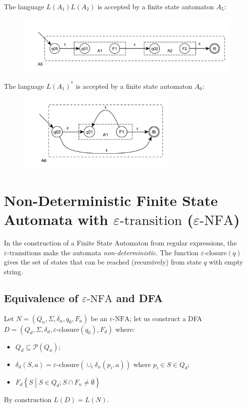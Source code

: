 The language $L(A_1)L(A_2)$ is accepted by a finite state automaton $A_5$:
\begin{figure}[H]
    \centerline{\includegraphics[width=1\textwidth]{img/8.pdf}}
\end{figure}

The language $L(A_1)^\ast$ is accepted by a finite state automaton $A_6$:
\begin{figure}[H]
    \centerline{\includegraphics[width=0.7\textwidth]{img/9.pdf}}
\end{figure}

\section{Non-Deterministic Finite State Automata with $\varepsilon\text{-transition}$ ($\varepsilon\text{-NFA}$)}
In the construction of a Finite State Automaton from regular expressions, the $\varepsilon\text{-transitions}$ make the automata \emph{non-deterministic}.
The function $\varepsilon\text{-closure}(q)$ gives the set of states that can be reached (recursively) from state $q$ with empty string.

\subsection{Equivalence of $\varepsilon\text{-NFA}$ and DFA}
Let $N = (Q_n, \Sigma, \delta_n, q_0, F_n)$ be an $\varepsilon\text{-NFA}$; let us construct a DFA $D = (Q_d, \Sigma, \delta_d, \varepsilon\text{-closure}(q_0), F_d)$ where:
\begin{itemize}
    \item $Q_d \subseteq \mathscr{P}(Q_n)$;
    \item $\delta_d(S, a) = \varepsilon\text{-closure}(\cup_i \delta_n(p_i, a))$ where $p_i \in S \in Q_d$;
    \item $F_d \left\{S \middle| S \in Q_d; S \cap F_n \neq \emptyset\right\}$
\end{itemize}
By construction $L(D) = L(N)$.

